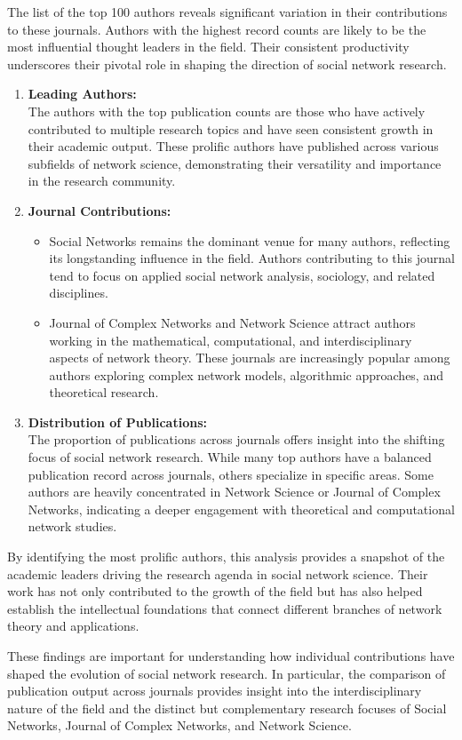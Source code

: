 \documentclass[twocolumn]{article}
\begin{document}
	The list of the top 100 authors reveals significant variation in their contributions to these journals. Authors with the highest record counts are likely to be the most influential thought leaders in the field. Their consistent productivity underscores their pivotal role in shaping the direction of social network research.

	\begin{enumerate}
		\item \textbf{Leading Authors:} \\ The authors with the top publication counts are those who have actively contributed to multiple research topics and have seen consistent growth in their academic output. These prolific authors have published across various subfields of network science, demonstrating their versatility and importance in the research community.
		\item \textbf{Journal Contributions:}
		\begin{itemize}
			\item Social Networks remains the dominant venue for many authors, reflecting its longstanding influence in the field. Authors contributing to this journal tend to focus on applied social network analysis, sociology, and related disciplines.
			\item Journal of Complex Networks and Network Science attract authors working in the mathematical, computational, and interdisciplinary aspects of network theory. These journals are increasingly popular among authors exploring complex network models, algorithmic approaches, and theoretical research.
		\end{itemize}
		\item \textbf{Distribution of Publications:} \\ The proportion of publications across journals offers insight into the shifting focus of social network research. While many top authors have a balanced publication record across journals, others specialize in specific areas. Some authors are heavily concentrated in Network Science or Journal of Complex Networks, indicating a deeper engagement with theoretical and computational network studies.
	\end{enumerate}

	By identifying the most prolific authors, this analysis provides a snapshot of the academic leaders driving the research agenda in social network science. Their work has not only contributed to the growth of the field but has also helped establish the intellectual foundations that connect different branches of network theory and applications.
	
	These findings are important for understanding how individual contributions have shaped the evolution of social network research. In particular, the comparison of publication output across journals provides insight into the interdisciplinary nature of the field and the distinct but complementary research focuses of Social Networks, Journal of Complex Networks, and Network Science.
	
	
	
	
\end{document}
